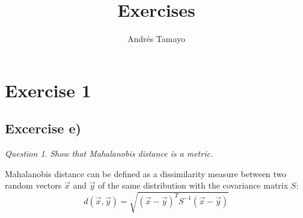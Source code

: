 \documentclass{article}
\title{Exercises}
\author{Andrés Tamayo }
\theoremstyle{definition}
\theoremstyle{remark}
\theoremstyle{remark}
\newtheorem{question}{Question}
\theoremstyle{example}
\begin{document}
\maketitle

\section*{Exercise 1}

\subsection*{Excercise e)}

\begin{question}
\textit{Show that Mahalanobis distance is a metric.}
\end{question}

Mahalanobis distance can be defined as a dissimilarity measure between two random vectors $\vec{x}$ and $\vec{y}$ of the same distribution with the covariance matrix $S$:
\[
d(\vec{x},\vec{y}) = \sqrt{(\vec{x} - \vec{y})^{T}S^{-1}(\vec{x}-\vec{y})}
\]
\end{document}
